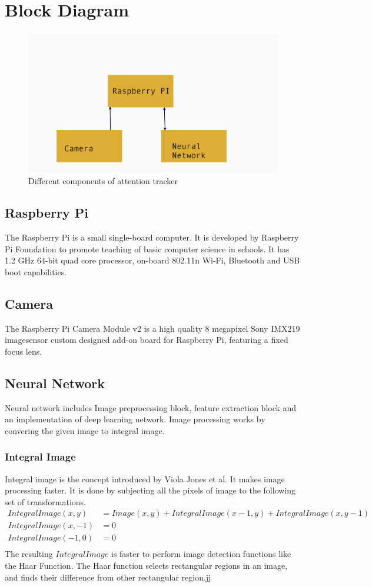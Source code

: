 \section{Block Diagram}
\begin{figure}[ht]
\centering
\includegraphics[scale=0.7]{block}
\caption{Different components of attention tracker}
\end{figure}

\subsection{Raspberry Pi}
The Raspberry Pi is a small single-board computer. It is developed by Raspberry Pi Foundation to promote teaching of basic computer science in schools. It has  1.2 GHz 64-bit quad core processor, on-board 802.11n Wi-Fi, Bluetooth and USB boot capabilities. 
\subsection{Camera}
The Raspberry Pi Camera Module v2 is a high quality 8 megapixel Sony IMX219 imagesensor custom designed add-on board for Raspberry Pi, featuring a fixed focus lens.
\subsection{Neural Network}
Neural network includes Image preprocessing block, feature extraction block and an implementation of deep learning network. Image processing works by convering the given image to integral image.
\subsubsection{Integral Image}
Integral image is the concept introduced by Viola Jones et al. It makes image processing faster. It is done by subjecting all the pixels of image to the following set of transformations.
\begin{align*}
    IntegralImage(x,y) &=Image(x,y)+IntegralImage(x-1,y)+IntegralImage(x,y-1)\\
    IntegralImage(x,-1) &=0\\
    IntegralImage(-1,0) &=0\\
\end{align*}
The resulting $IntegralImage$ is faster to perform image detection functions like the Haar Function. The Haar function selects rectangular regions in an image, and finds their difference from other
rectangular region.jj
